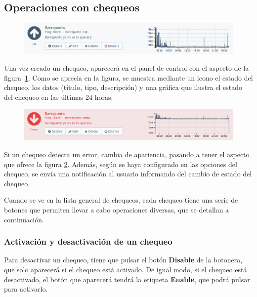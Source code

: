 \subsection{Operaciones con chequeos}

\begin{figure}[hbtp]
  \centering
  \includegraphics[width=\textwidth]{apendice_manual_usuario/chequeo_valido.png}
  \caption{}
  \label{fig:chequeo}
\end{figure}

Una vez creado un chequeo, aparecerá en el panel de control con el aspecto de la
figura~\ref{fig:chequeo}. Como se aprecia en la figura, se muestra mediante un
icono el estado del chequeo, los datos (título, tipo, descripción) y una gráfica
que ilustra el estado del chequeo en las últimas 24 horas.

\begin{figure}[hbtp]
  \centering
  \includegraphics[width=\textwidth]{apendice_manual_usuario/chequeo_invalido.png}
  \caption{}
  \label{fig:chequeo-invalido}
\end{figure}

Si un chequeo detecta un error, cambia de apariencia, pasando a tener el aspecto
que ofrece la figura \ref{fig:chequeo-invalido}. Además, según se haya
configurado en las opciones del chequeo, se envía una notificación al usuario
informando del cambio de estado del chequeo.

Cuando se ve en la lista general de chequeos, cada chequeo tiene una serie de
botones que permiten llevar a cabo operaciones diversas, que se detallan a
continuación.

\subsubsection{Activación y desactivación de un chequeo}

Para desactivar un chequeo, tiene que pulsar el botón \textbf{Disable} de la
botonera, que solo aparecerá si el chequeo está activado. De igual modo, si el
chequeo está desactivado, el botón que aparecerá tendrá la etiqueta
\textbf{Enable}, que podrá pulsar para activarlo.

